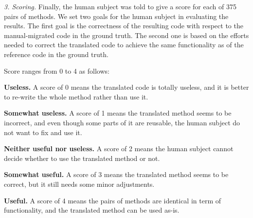 \emph{3. Scoring.} Finally, the human subject was told to give a score
for each of 375 pairs of methods. We set two goals for the human
subject in evaluating the results. The first goal is the correctness of
the resulting code with respect to the manual-migrated code in the
ground truth. The second one is based on the efforts needed to correct
the translated code to achieve the same functionality as of the
reference code in the ground truth.
%

Score ranges from 0 to 4 as follows:

\begin{compactitem}

\item {\bf Useless.} A score of 0 means the translated code is totally useless, and
  it is better to re-write the whole method rather than use it.

\item {\bf Somewhat useless.} A score of 1 means the translated method
  seems to be incorrect, and even though some parts of it are
  reusable, the human subject do not want to fix and use it.

\item {\bf Neither useful nor useless.} A score of 2 means the human
  subject cannot decide whether to use the translated method or not.

\item {\bf Somewhat useful.} A score of 3 means the translated method
  seems to be correct, but it still needs some minor adjustments.

\item {\bf Useful.} A score of 4 means the pairs of methods are
  identical in term of functionality, and the translated method can be
  used as-is.

\end{compactitem}

